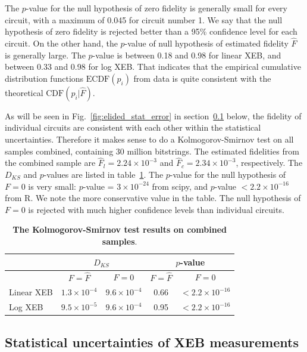The $p$-value for the null hypothesis of zero fidelity is generally small for every circuit, with a maximum of 0.045 for circuit number 1. We say that the null hypothesis of zero fidelity is rejected better than a 95\% confidence level for each circuit. On the other hand, the $p$-value of null hypothesis of estimated fidelity $\hat F$ is generally large. The $p$-value is between 0.18 and 0.98 for linear XEB, and between 0.33 and 0.98 for log XEB. That indicates that the empirical cumulative distribution functions $\text{ECDF}(p_i)$  from data is quite consistent with the theoretical $\text{CDF}(p_i|\hat F)$.

As will be seen in Fig.~\ref{fig:elided_stat_error} in section~\ref{subsec:xeb_stat_uncertainty} below, the fidelity of individual circuits are consistent with each other within the statistical uncertainties. Therefore it makes sense to do a Kolmogorov-Smirnov test on all samples combined, containing 30 million bitstrings. The estimated fidelities from the combined sample are $\hat F_l = 2.24\times 10^{-3}$ and $\hat F_c = 2.34\times 10^{-3}$, respectively. The $D_{KS}$ and $p$-values are listed in table~\ref{tab:ks_test_for_combined_samples}. The $p$-value for the null hypothesis of $F=0$ is very small: $p$-value = $3\times 10^{-24}$ from scipy, and $p$-value $< 2.2\times 10^{-16}$ from R. We note the more conservative value in the table. The null hypothesis of $F=0$ is rejected with much higher confidence levels than individual circuits.

\begin{table}[] \label{tab:ks_test_for_combined_samples}
\renewcommand{\arraystretch}{1.3}
\begin{tabular}{|l|c|c|c|c|} \hline
  & \multicolumn{2}{c|}{$D_{KS}$} & \multicolumn{2}{c|}{$p$-value} \\ \hline
           & $F=\hat F$ & $F=0$  & $F=\hat F$ & $F=0$ \\ \hline
Linear XEB & $1.3\times 10^{-4}$  & $9.6\times 10^{-4}$ & 0.66 & $< 2.2\times 10^{-16}$ \\
Log XEB & $9.5\times 10^{-5}$  & $9.6\times 10^{-4}$  & 0.95 & $< 2.2\times 10^{-16}$ \\ \hline
\end{tabular}
\caption{{\bf The Kolmogorov-Smirnov test results on combined samples}.}
\end{table}

\subsection{Statistical uncertainties of XEB measurements}
\label{subsec:xeb_stat_uncertainty}

